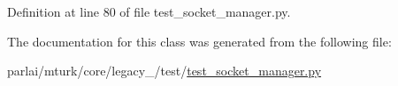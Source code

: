 Definition at line 80 of file test\+\_\+socket\+\_\+manager.\+py.



The documentation for this class was generated from the following file\+:\begin{DoxyCompactItemize}
\item 
parlai/mturk/core/legacy\+\_/test/\hyperlink{legacy__2018_2test_2test__socket__manager_8py}{test\+\_\+socket\+\_\+manager.\+py}\end{DoxyCompactItemize}
